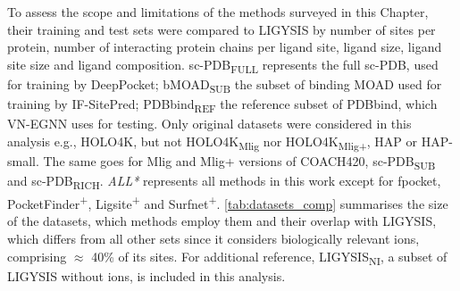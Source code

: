 To assess the scope and limitations of the methods surveyed in this Chapter, their training and test sets were compared to LIGYSIS by number of sites per protein, number of interacting protein chains per ligand site, ligand size, ligand site size and ligand composition. sc-PDB\textsubscript{FULL} represents the full sc-PDB, used for training by DeepPocket; bMOAD\textsubscript{SUB} the subset of binding MOAD used for training by IF-SitePred; PDBbind\textsubscript{REF} the reference subset of PDBbind, which VN-EGNN uses for testing. Only original datasets were considered in this analysis e.g., HOLO4K, but not HOLO4K\textsubscript{Mlig} nor HOLO4K\textsubscript{Mlig+}, HAP or HAP-small. The same goes for Mlig and Mlig+ versions of COACH420, sc-PDB\textsubscript{SUB} and sc-PDB\textsubscript{RICH}. \textit{ALL*} represents all methods in this work except for fpocket, PocketFinder\textsuperscript{+}, Ligsite\textsuperscript{+} and Surfnet\textsuperscript{+}. \autoref{tab:datasets_comp} summarises the size of the datasets, which methods employ them and their overlap with LIGYSIS, which differs from all other sets since it considers biologically relevant ions, comprising $\approx$ 40\% of its sites. For additional reference, LIGYSIS\textsubscript{NI}, a subset of LIGYSIS without ions, is included in this analysis. 

